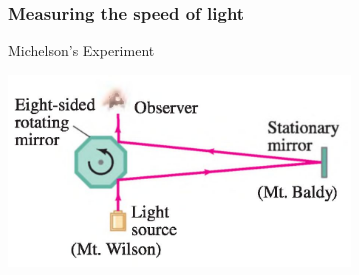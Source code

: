 \documentclass[]{beamer}
\begin{document}

























\begin{frame}

\frametitle{Measuring the speed of light}

Michelson's Experiment

  \begin{center}
  \includegraphics[height=2.0in]{images5/Michelson.jpg}
\end{center}




  \end{frame}

\end{document}
